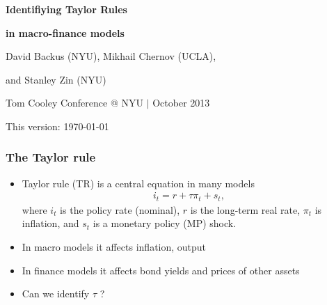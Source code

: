 \documentclass[handout]{beamer}
\begin{document}

\vspace*{0.5in}
\centerline{\textcolor{DB}{\Large\bf Identifiying Taylor Rules}}
\centerline{\textcolor{DB}{\Large\bf in macro-finance models}}

\bigskip\bigskip%
\centerline{David Backus (NYU), Mikhail Chernov (UCLA), }
\centerline{and Stanley Zin (NYU)}

\bigskip\bigskip%
\centerline{Tom Cooley Conference @ NYU $|$ October 2013}

\vfill
{\tiny This version: \today}






\begin{frame}
\frametitle{The Taylor rule}

\begin{itemize} \itemsep=\bigskipamount
   \item Taylor rule (TR) is a central equation in many models
      \begin{eqnarray*}
            i_t = r + \tau \pi_t + s_t,
      \end{eqnarray*}
where $i_t$ is the policy rate (nominal), $r$ is the long-term real rate, $\pi_t$ is inflation, and $s_t$ is a monetary policy (MP) shock.
\pause
  \item In macro models it affects inflation, output
  \item In finance models it affects bond yields and prices of other assets
  \item Can we identify $\tau$ ?
\end{itemize}
\end{frame}
\end{document}
